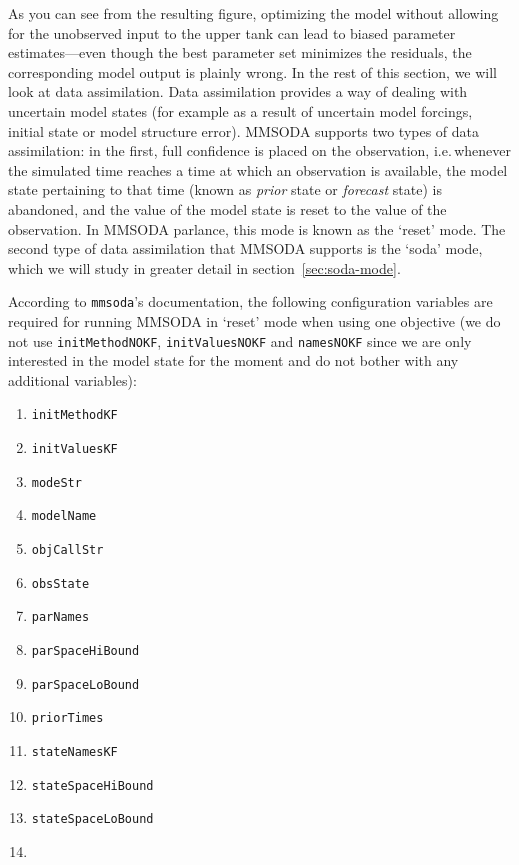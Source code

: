 As you can see from the resulting figure, optimizing the model without allowing for the unobserved input to the upper tank can lead to biased parameter estimates---even though the best parameter set minimizes the residuals, the corresponding model output is plainly wrong. In the rest of this section, we will look at data assimilation. Data assimilation provides a way of dealing with uncertain model states (for example as a result of uncertain model forcings, initial state or model structure error). MMSODA supports two types of data assimilation: in the first, full confidence is placed on the observation, i.e.\,whenever the simulated time reaches a time at which an observation is available, the model state pertaining to that time (known as \textit{prior} state or \textit{forecast} state) is abandoned, and the value of the model state is reset to the value of the observation. In MMSODA parlance, this mode is known as the `reset' mode. The second type of data assimilation that MMSODA supports is the `soda' mode, which we will study in greater detail in section~\ref{sec:soda-mode}.


According to \texttt{mmsoda}'s documentation, the following configuration variables are required for running MMSODA in `reset' mode when using one objective (we do not use \texttt{initMethodNOKF}, \texttt{initValuesNOKF} and \texttt{namesNOKF} since we are only interested in the model state for the moment and do not bother with any additional variables):

\begin{multicols}{2}
\begin{enumerate}
\item{\texttt{initMethodKF}}
\item{\texttt{initValuesKF}}
\item{\texttt{modeStr}}
\item{\texttt{modelName}}
\item{\texttt{objCallStr}}
\item{\texttt{obsState}}
\item{\texttt{parNames}}
\item{\texttt{parSpaceHiBound}}
\item{\texttt{parSpaceLoBound}}
\item{\texttt{priorTimes}}
\item{\texttt{stateNamesKF}}
\item{\texttt{stateSpaceHiBound}}
\item{\texttt{stateSpaceLoBound}}
\item[]{}
\end{enumerate}
\end{multicols}

